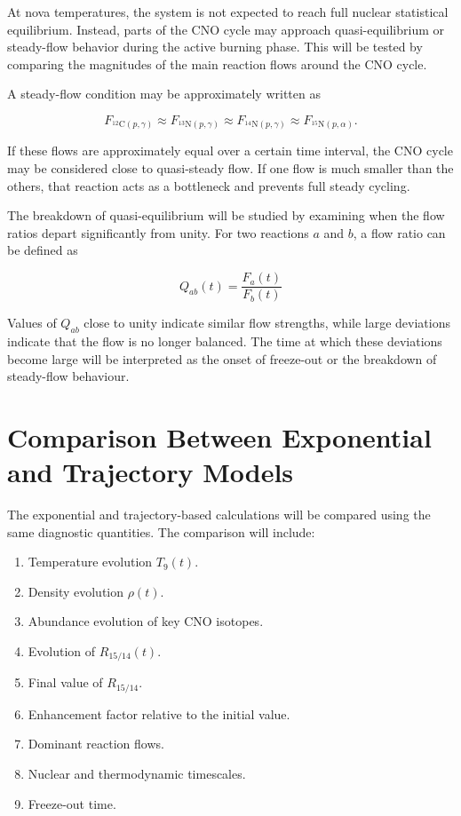 At nova temperatures, the system is not expected to reach full nuclear statistical equilibrium. Instead, parts of the CNO cycle may approach quasi-equilibrium or steady-flow behavior during the active burning phase. This will be tested by comparing the magnitudes of the main reaction flows around the CNO cycle.

A steady-flow condition may be approximately written as

\[
F_{^{12}\mathrm{C}(p,\gamma)}
\approx
F_{^{13}\mathrm{N}(p,\gamma)}
\approx
F_{^{14}\mathrm{N}(p,\gamma)}
\approx
F_{^{15}\mathrm{N}(p,\alpha)} .
\]

If these flows are approximately equal over a certain time interval, the CNO cycle may be considered close to quasi-steady flow. If one flow is much smaller than the others, that reaction acts as a bottleneck and prevents full steady cycling.

The breakdown of quasi-equilibrium will be studied by examining when the flow ratios depart significantly from unity. For two reactions $a$ and $b$, a flow ratio can be defined as

\begin{equation}
    Q_{ab}(t) =
\frac{F_a(t)}{F_b(t)}
\end{equation}

Values of $Q_{ab}$ close to unity indicate similar flow strengths, while large deviations indicate that the flow is no longer balanced. The time at which these deviations become large will be interpreted as the onset of freeze-out or the breakdown of steady-flow behaviour.

\section{Comparison Between Exponential and Trajectory Models}

The exponential and trajectory-based calculations will be compared using the same diagnostic quantities. The comparison will include:

\begin{enumerate}
    \item Temperature evolution $T_9(t)$.
    \item Density evolution $\rho(t)$.
    \item Abundance evolution of key CNO isotopes.
    \item Evolution of $R_{15/14}(t)$.
    \item Final value of $R_{15/14}$.
    \item Enhancement factor relative to the initial value.
    \item Dominant reaction flows.
    \item Nuclear and thermodynamic timescales.
    \item Freeze-out time.
\end{enumerate}

